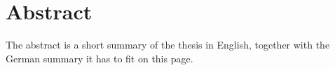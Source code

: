 \thispagestyle{plain}
\nocite{PhysRevLett.121.221802}

\section*{Abstract}
\begin{english}
The abstract is a short summary of the thesis in English, together with the German summary it has to fit on this page.
\end{english}
